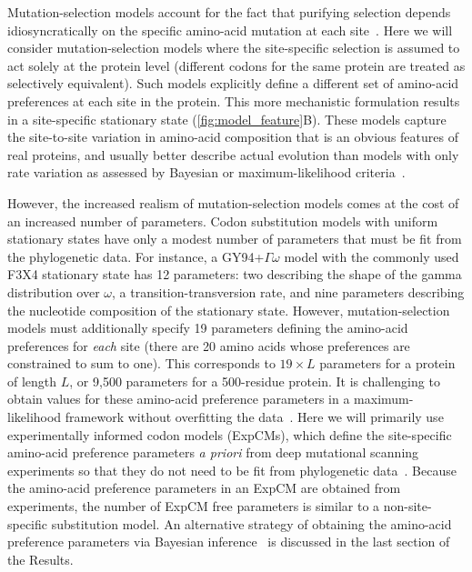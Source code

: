 \documentclass[11pt]{article}
\begin{document}
Mutation-selection models account for the fact that purifying selection depends idiosyncratically on the specific amino-acid mutation at each site~\citep{halpern1998evolutionary,yang2008mutation,rodrigue2010mutation,tamuri2012estimating,mccandlish2014modeling}.
Here we will consider mutation-selection models where the site-specific selection is assumed to act solely at the protein level (different codons for the same protein are treated as selectively equivalent).
Such models explicitly define a different set of amino-acid preferences at each site in the protein. 
This more mechanistic formulation results in a site-specific stationary state (\ref{fig:model_feature}B). 
These models capture the site-to-site variation in amino-acid composition that is an obvious features of real proteins, and usually better describe actual evolution than models with only rate variation as assessed by Bayesian or maximum-likelihood criteria~\citep{lartillot2004bayesian, le2008phylogenetic, si2008empirical, wang2008class, rodrigue2010mutation,bloom2014experimentally,bloom2014informed,hilton2017phydms}.

However, the increased realism of mutation-selection models comes at the cost of an increased number of parameters. 
Codon substitution models with uniform stationary states have only a modest number of parameters that must be fit from the phylogenetic data.
For instance, a GY94+$\Gamma\omega$ model with the commonly used F3X4 stationary state has 12 parameters: two describing the shape of the gamma distribution over $\omega$, a transition-transversion rate, and nine parameters describing the nucleotide composition of the stationary state.
However, mutation-selection models must additionally specify 19 parameters defining the amino-acid preferences for \emph{each} site (there are 20 amino acids whose preferences are constrained to sum to one).
This corresponds to $19\times L$ parameters for a protein of length $L$, or 9,500 parameters for a 500-residue protein.
It is challenging to obtain values for these amino-acid preference parameters in a maximum-likelihood framework without overfitting the data~\citep{rodrigue2013statistical}.
Here we will primarily use experimentally informed codon models (ExpCMs), which define the site-specific amino-acid preference parameters \textit{a priori} from deep mutational scanning experiments so that they do not need to be fit from phylogenetic data~\citep[see Methods and][]{bloom2014experimentally, hilton2017phydms, bloom2017identification}.
Because the amino-acid preference parameters in an ExpCM are obtained from experiments, the number of ExpCM free parameters is similar to a non-site-specific substitution model.
An alternative strategy of obtaining the amino-acid preference parameters via Bayesian inference~\citep{lartillot2004bayesian, rodrigue2014site} is discussed in the last section of the Results.
\end{document}
